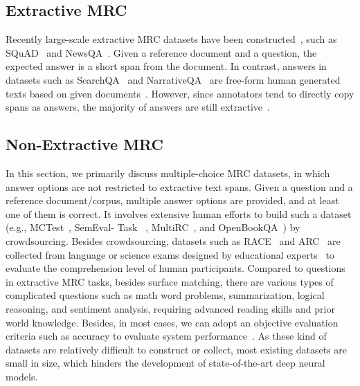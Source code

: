 \documentclass[11pt,a4paper]{article}
\newcommand{\eg}{{e.g.}}
\begin{document}
\subsection{Extractive MRC}
\label{sec:task:extractive}
Recently large-scale extractive MRC datasets have been constructed~\cite{hermann2015teaching,hill2015goldilocks,onishi2016did,chen2016character,mostafazadeh2016corpus,bajgar2016embracing,nguyen2016ms,triviaQA,ma2018challenging}, such as SQuAD~\cite{rajpurkar2016squad} and NewsQA~\cite{trischler2017newsqa}. Given a reference document and a question, the expected answer is a short span from the document. In contrast, answers in datasets such as SearchQA~\cite{dunn2017searchqa} and NarrativeQA~\cite{kovcisky2018narrativeqa} are free-form human generated texts based on given documents~\cite{nguyen2016ms,reddy2018coqa,choi2018quac}. However, since annotators tend to directly copy spans as answers, the majority of answers are still extractive~\cite{reddy2018coqa,kovcisky2018narrativeqa}. 

\subsection{Non-Extractive MRC}
\label{sec:task:multiple}
In this section, we primarily discuss multiple-choice MRC datasets, in which answer options are not restricted to extractive text spans. Given a question and a reference document/corpus, multiple answer options are provided, and at least one of them is correct. It involves extensive
human efforts to build such a dataset (\eg, MCTest~\cite{richardson2013mctest}, SemEval- Task ~\cite{ostermann2018semeval}, MultiRC~\cite{khashabi2018looking}, and OpenBookQA~\cite{mihaylov2018can}) by crowdsourcing. Besides crowdsourcing, datasets such as RACE~\cite{lai2017race} and ARC~\cite{clark2018think} are collected from language or science exams designed by educational experts~\cite{penas2014overview,shibuki2014overview,tseng2016towards} to evaluate the comprehension level of human participants. Compared to questions in extractive MRC tasks, besides surface matching, there are various types of complicated questions such as math word problems, summarization, logical reasoning, and sentiment analysis, requiring advanced reading skills and prior world knowledge. Besides, in most cases, we can adopt an objective evaluation criteria such as accuracy to evaluate system performance~\cite{clark2016combining,lai2017race}. As these kind of datasets are relatively difficult to construct or collect, most existing datasets are small in size, which hinders the development of state-of-the-art deep neural models. 
\end{document}
